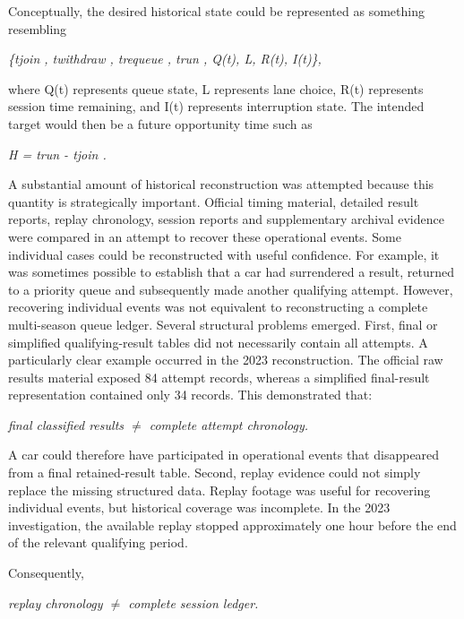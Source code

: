 Conceptually, the desired historical state could be represented as something resembling

\begin{center}\textit{\{tjoin , twithdraw , trequeue , trun , Q(t), L, R(t), I(t)\},}\end{center}

where Q(t) represents queue state, L represents lane choice, R(t) represents session time remaining, and I(t) represents interruption state. The intended target would then be a future opportunity time such as

\begin{center}\textit{H = trun - tjoin .}\end{center}

A substantial amount of historical reconstruction was attempted because this quantity is strategically important. Official timing material, detailed result reports, replay chronology, session reports and supplementary archival evidence were compared in an attempt to recover these operational events. Some individual cases could be reconstructed with useful confidence. For example, it was sometimes possible to establish that a car had surrendered a result, returned to a priority queue and subsequently made another qualifying attempt. However, recovering individual events was not equivalent to reconstructing a complete multi-season queue ledger. Several structural problems emerged. First, final or simplified qualifying-result tables did not necessarily contain all attempts. A particularly clear example occurred in the 2023 reconstruction. The official raw results material exposed 84 attempt records, whereas a simplified final-result representation contained only 34 records. This demonstrated that:

\begin{center}\textit{final classified results \ensuremath{\neq} complete attempt chronology.}\end{center}

A car could therefore have participated in operational events that disappeared from a final retained-result table. Second, replay evidence could not simply replace the missing structured data. Replay footage was useful for recovering individual events, but historical coverage was incomplete. In the 2023 investigation, the available replay stopped approximately one hour before the end of the relevant qualifying period.

Consequently,

\begin{center}\textit{replay chronology \ensuremath{\neq} complete session ledger.}\end{center}

